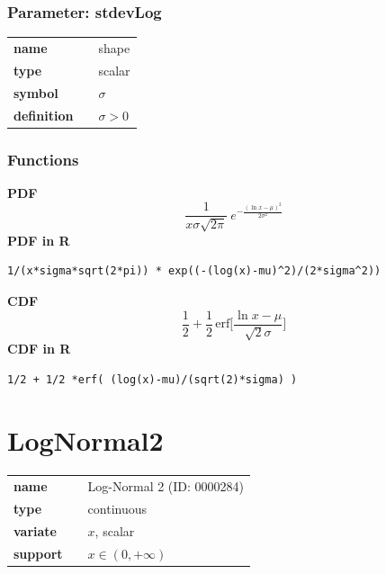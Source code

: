 \documentclass{article}
\begin{document}
\subsubsection*{Parameter: stdevLog}

\noindent\begin{tabular}{p{2cm}cl}
\textbf{name} & & shape \\
\textbf{type} & & scalar \\
\textbf{symbol} & & $\sigma$  \\
\textbf{definition} & & $\sigma > 0$
\end{tabular}
\subsubsection*{Functions}

\smallskip \noindent \hspace{.2cm} \textbf{PDF} 
\begin{equation*}\frac{1}{x\sigma\sqrt{2\pi}}\ e^{-\frac{\left(\ln x-\mu\right)^2}{2\sigma^2}}\end{equation*}
\smallskip \noindent \hspace{.2cm} \textbf{PDF in R}  
\begin{verbatim}1/(x*sigma*sqrt(2*pi)) * exp((-(log(x)-mu)^2)/(2*sigma^2))\end{verbatim}
\smallskip \noindent \hspace{.2cm} \textbf{CDF} 
\begin{equation*}\frac12 + \frac12\,\text{erf}\Big[\frac{\ln x-\mu}{\sqrt{2}\sigma}\Big]\end{equation*}
\smallskip \noindent \hspace{.2cm} \textbf{CDF in R} 
\begin{verbatim}1/2 + 1/2 *erf( (log(x)-mu)/(sqrt(2)*sigma) )\end{verbatim}
\smallskip\section*{LogNormal2} 

  \bigskip 

\begin{tabular}{p{2cm}cl}
\textbf{name} & & Log-Normal 2 (ID: 0000284)\\ 
 
\textbf{type} & & continuous \\ 

\textbf{variate} & & $x$, scalar \\ 

\textbf{support} & & $x \in (0,+\infty)$
\end{tabular}
\end{document}
